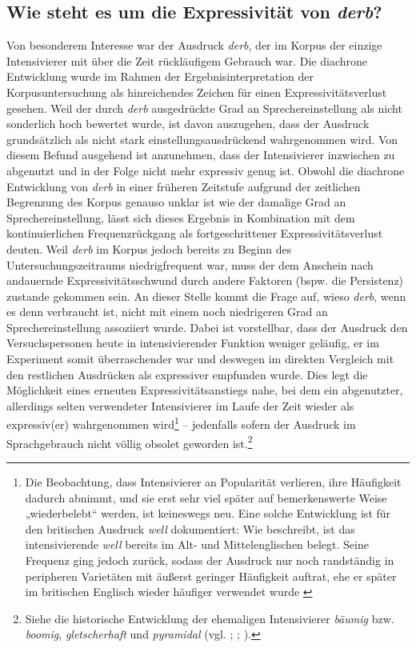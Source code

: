 \subsection[Zur Expressivität von \textit{derb}]{Wie steht es um die Expressivität von \emph{derb}?}
\largerpage
Von besonderem Interesse war der Ausdruck \textit{derb}, der im Korpus der einzige Intensivierer mit über die Zeit rückläufigem Gebrauch war. Die diachrone Entwicklung wurde im Rahmen der Ergebnisinterpretation der Korpusuntersuchung als hinreichendes Zeichen für einen Expressivitätsverlust gesehen. Weil der durch \textit{derb} ausgedrückte Grad an Sprechereinstellung als nicht sonderlich hoch bewertet wurde, ist davon auszugehen, dass der Ausdruck grundsätzlich als nicht stark einstellungsausdrückend wahrgenommen wird. Von diesem Befund ausgehend ist anzunehmen, dass der Intensivierer inzwischen zu abgenutzt und in der Folge nicht mehr expressiv genug ist. Obwohl die diachrone Entwicklung von \textit{derb} in einer früheren Zeitstufe aufgrund der zeitlichen Begrenzung des Korpus genauso unklar ist wie der damalige Grad an Sprechereinstellung, lässt sich dieses Ergebnis in Kombination mit dem kontinuierlichen Frequenzrückgang als fortgeschrittener Expressivitätsverlust deuten. Weil \textit{derb} im Korpus jedoch bereits zu Beginn des Untersuchungszeitraums niedrigfrequent war, muss der dem Anschein nach andauernde Expressivitätsschwund durch andere Faktoren (bspw. die Persistenz) zustande gekommen sein. An dieser Stelle kommt die Frage auf, wieso \textit{derb}, wenn es denn verbraucht ist, nicht mit einem noch niedrigeren Grad an Sprechereinstellung assoziiert wurde. Dabei ist vorstellbar, dass der Ausdruck den Versuchspersonen heute in intensivierender Funktion weniger geläufig, er im Experiment somit überraschender war und deswegen im direkten Vergleich mit den restlichen Ausdrücken als expressiver empfunden wurde. Dies legt die Möglichkeit eines erneuten Expressivitätsanstiegs nahe, bei dem ein abgenutzter, allerdings selten verwendeter Intensivierer im Laufe der Zeit wieder als expressiv(er) wahrgenommen wird\footnote{Die Beobachtung, dass Intensivierer an Popularität verlieren, ihre Häufigkeit dadurch abnimmt, und sie erst sehr viel später auf bemerkenswerte Weise „wiederbelebt“ werden, ist keineswegs neu. Eine solche Entwicklung ist für den britischen Ausdruck \textit{well} dokumentiert: Wie \citet[]{Stratton.2020d,Stratton.2022a} beschreibt, ist das intensivierende \textit{well} bereits im Alt- und Mittelenglischen belegt. Seine Frequenz ging jedoch zurück, sodass der Ausdruck nur noch randständig in peripheren Varietäten mit äußerst geringer Häufigkeit auftrat, ehe er später im britischen Englisch wieder häufiger verwendet wurde \citep[vgl.][]{Stratton.2018,Stratton.2020d,Stratton.2020a}} -- jedenfalls sofern der Ausdruck im Sprachgebrauch nicht völlig obsolet {geworden ist.}\footnote{Siehe die historische Entwicklung der ehemaligen Intensivierer \textit{bäumig}  bzw. \textit{boomig}, \textit{gletscherhaft} und \textit{pyramidal} (vgl. \citealt[135]{Tobler.1868}; {\citealt[7f.]{Mueller.1899}}; {\citealt[268]{Becher.1907}}).}

